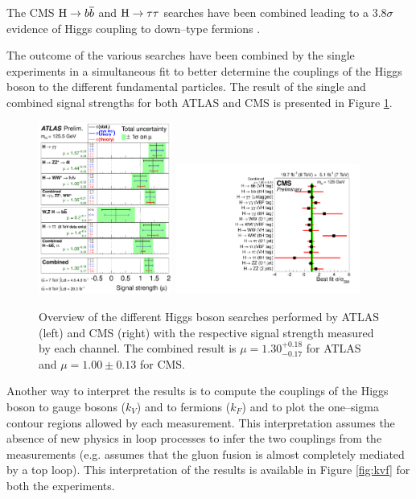 The CMS $\mathrm{H} \rightarrow b\overline{b}$ and $\mathrm{H} \rightarrow \tau \tau$ searches have been combined leading to a $3.8\sigma$ evidence of Higgs coupling to down--type fermions \cite{Chatrchyan:2014vua}.

The outcome of the various searches have been combined by the single experiments in a simultaneous fit to better determine the couplings of the Higgs boson to the different fundamental particles. The result of the single and combined signal strengths for both ATLAS \cite{ATLASCONF:2014009} and CMS \cite{CMS:2014ega} is presented in Figure \ref{fig:combination}.

\begin{figure}
        \centering
	\includegraphics[width=0.39\textwidth]{1_Introduction_Th_and_Exp/pics/fig_01.pdf}
	\includegraphics[width=0.54\textwidth]{1_Introduction_Th_and_Exp/pics/sqr_mlz_ccc_mH125.pdf}
       \caption{Overview of the different Higgs boson searches performed by ATLAS (left) and CMS (right) with the respective signal strength measured by each channel. The combined result is $\mu = 1.30^{+0.18}_{-0.17}$ for ATLAS and $\mu = 1.00 \pm 0.13$ for CMS.}
       \label{fig:combination}
\end{figure}

Another way to interpret the results is to compute the couplings of the Higgs boson to gauge bosons ($k_V$) and to fermions ($k_F$) and to plot the one--sigma contour regions allowed by each measurement. This interpretation assumes the absence of new physics in loop processes to infer the two couplings from the measurements (e.g. assumes that the gluon fusion is almost completely mediated by a top loop). This interpretation of the results is available in Figure \ref{fig:kvf} for both the experiments.

